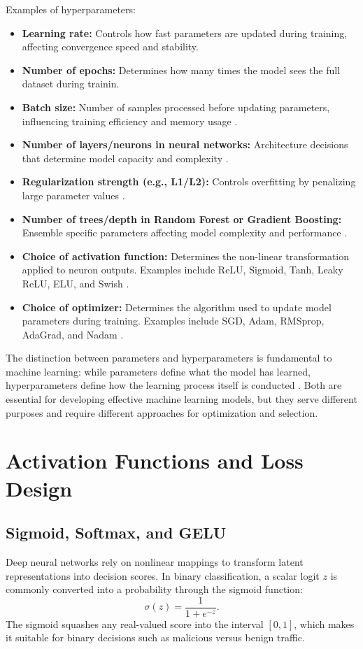 \documentclass[12pt, a4paper]{report}
\begin{document}
Examples of hyperparameters:
\begin{itemize}
    \item \textbf{Learning rate:} Controls how fast parameters are updated during training, affecting convergence speed and stability.
    \item \textbf{Number of epochs:} Determines how many times the model sees the full dataset during trainin.
    \item \textbf{Batch size:} Number of samples processed before updating parameters, influencing training efficiency and memory usage .
    \item \textbf{Number of layers/neurons in neural networks:} Architecture decisions that determine model capacity and complexity .
    \item \textbf{Regularization strength (e.g., L1/L2):} Controls overfitting by penalizing large parameter values .
    \item \textbf{Number of trees/depth in Random Forest or Gradient Boosting:} Ensemble specific parameters affecting model complexity and performance .
    \item \textbf{Choice of activation function:} Determines the non-linear transformation applied to neuron outputs. Examples include ReLU, Sigmoid, Tanh, Leaky ReLU, ELU, and Swish .
    \item \textbf{Choice of optimizer:} Determines the algorithm used to update model parameters during training. Examples include SGD, Adam, RMSprop, AdaGrad, and Nadam .
\end{itemize}

The distinction between parameters and hyperparameters is fundamental to machine learning: while parameters define what the model has learned, hyperparameters define how the learning process itself is conducted . Both are essential for developing effective machine learning models, but they serve different purposes and require different approaches for optimization and selection.

\section{Activation Functions and Loss Design}

\subsection{Sigmoid, Softmax, and GELU}
Deep neural networks rely on nonlinear mappings to transform latent representations into decision scores. In binary classification, a scalar logit $z$ is commonly converted into a probability through the sigmoid function:
\begin{equation}
\sigma(z)=\frac{1}{1+e^{-z}}.
\end{equation}
The sigmoid squashes any real-valued score into the interval $[0,1]$, which makes it suitable for binary decisions such as malicious versus benign traffic.
\end{document}
